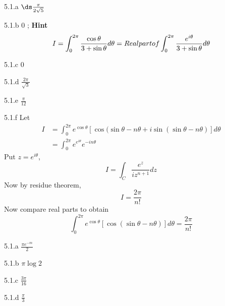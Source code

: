 \begin{Solution}{5.1.a}
	$\ds \frac{\pi}{2\sqrt{5}}$
	
\end{Solution}
\begin{Solution}{5.1.b}
	0 ; \textbf{Hint}
	\[I = \int_0^{2\pi}{\cos \theta \over 3+\sin\theta} d\theta = Real part of \int_0^{2\pi}{\frac{e^{i\theta}}{3+\sin\theta}} d\theta \]
	
\end{Solution}
\begin{Solution}{5.1.c}
	0
	
\end{Solution}
\begin{Solution}{5.1.d}
	$\frac{2\pi}{\sqrt{3}}$
	
\end{Solution}
\begin{Solution}{5.1.e}
	$\frac{\pi}{12}$
	
\end{Solution}
\begin{Solution}{5.1.f}
	Let
	\begin{align*}
	I &=\int_0^{2\pi} e^{\cos \theta}[\cos(\sin \theta - n \theta+ i\sin(\sin \theta - n \theta)]d\theta \\
		&= \int_0^{2\pi}e^{e^{i\theta}}e^{-in\theta}
\end{align*}
	Put $z=e^{i\theta}$,
	\[I = \int_C \frac{e^z}{iz^{n+1}}dz\]
	Now by residue theorem,
	\[I = \frac{2\pi}{n!}\]
	Now compare real parts to obtain
	\[\int_0^{2\pi} e^{\cos \theta}[\cos(\sin \theta - n \theta)]d\theta = \frac{2\pi}{n!}\]

	
\end{Solution}
\begin{Solution}{5.1.a}
$\frac{\pi e^{-m}}{2}$
\end{Solution}
\begin{Solution}{5.1.b}
$\pi \log 2$
\end{Solution}
\begin{Solution}{5.1.c}
$\frac{3\pi}{16}$
\end{Solution}
\begin{Solution}{5.1.d}
$\frac{\pi}{3}$
\end{Solution}
